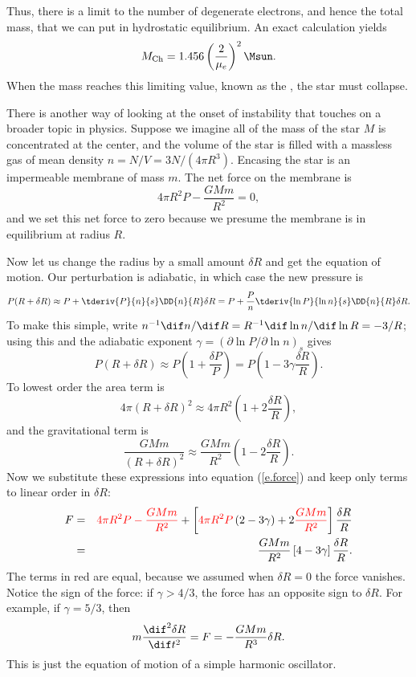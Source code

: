 Thus, there is a limit to the number of degenerate electrons, and hence the total mass, that we can put in hydrostatic equilibrium.  An exact calculation yields
\begin{equation}\label{e.Chandrasekhar}
	M_{\mathrm{Ch}} = 1.456 \left(\frac{2}{\mu_{e}}\right)^{2}\Msun.
\end{equation}
When the mass reaches this limiting value, known as the , the star must collapse.

\begin{sidebar}
There is another way of looking at the onset of instability that touches on a broader topic in physics. Suppose we imagine all of the mass of the star $M$ is concentrated at the center, and the volume of the star is filled with a massless gas of mean density $n = N/V = 3N/(4\pi R^{3})$. Encasing the star is an impermeable membrane of mass $m$.  The net force on the membrane is
\begin{equation}\label{e.force}
	4\pi R^{2} P - \frac{GMm}{R^{2}} = 0,
\end{equation}
and we set this net force to zero because we presume the membrane is in equilibrium at radius $R$.

Now let us change the radius by a small amount $\delta R$ and get the equation of motion. Our perturbation is adiabatic, in which case the new pressure is
\[ 
	P(R+\delta R) \approx P + \tderiv{P}{n}{s}\DD{n}{R}\delta R 
	= P + \frac{P}{n}\tderiv{\ln P}{\ln n}{s} \DD{n}{R}\delta R. 
\]
To make this simple, write $n^{-1}\dif n/\dif R = R^{-1}\dif\ln n/\dif\ln R = -3/R$; using this and the adiabatic exponent $\gamma = (\partial\ln P/\partial\ln n)_{s}$ gives
\[
	P(R+\delta R) \approx P\left(1 + \frac{\delta P}{P}\right) 
	= P\left(1 - 3\gamma \frac{\delta R}{R}\right).
\]
To lowest order the area term is
\[ 4\pi (R+\delta R)^{2} \approx 4\pi R^{2}\left(1 + 2\frac{\delta R}{R}\right), \]
and the gravitational term is
\[
	\frac{GMm}{(R+\delta R)^{2}} \approx \frac{GMm}{R^{2}}\left(1-2\frac{\delta R}{R}\right).
\]
Now we substitute these expressions into equation (\ref{e.force}) and keep only terms to linear order in $\delta R$:
\begin{eqnarray}
	F &=& \color{red} 4\pi R^{2} P - \frac{GMm}{R^{2}}
	\color{black} + \left[{\color{red}4\pi R^{2}P}\left( 2 - 3\gamma \right) + 2 {\color{red}\frac{GMm}{R^{2}}} \right ] \frac{\delta R}{R} \nonumber\\
	&=& \frac{GMm}{R^{2}} \left[4 - 3\gamma\right]\frac{\delta R}{R}.
\end{eqnarray}
The terms in red are equal, because we assumed when $\delta R = 0$ the force vanishes.  Notice the sign of the force: if $\gamma > 4/3$, the force has an opposite sign to $\delta R$. For example, if $\gamma = 5/3$, then 
\begin{equation}\label{e.SHO}
	m\frac{\dif^{2}\delta R}{\dif t^{2}} = F  = - \frac{GMm}{R^{3}}\delta R.
\end{equation}
This is just the equation of motion of a simple harmonic oscillator.


\end{sidebar}

